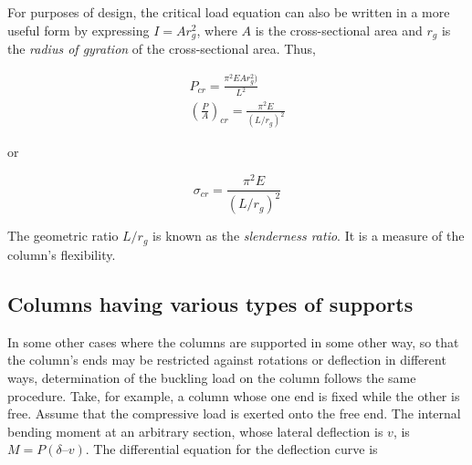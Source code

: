 \documentclass[
10pt,
a4paper,
openany,
svgnames,
]{book}
\begin{document}
For purposes of design, the critical load equation can also be written in a more useful form by expressing $I = Ar_g^2$, where $A$ is the cross-sectional area and $r_g$ is the \emph{radius of gyration} of the cross-sectional area. Thus,

\begin{gather*}
  P_{cr} = \frac{\pi^2EAr_g^2)}{L^2} \\ 
  \left( \frac{P}{A} \right)_{cr} = \frac{\pi ^2E}{(L/r_g)^2}
\end{gather*}

or

\begin{equation}
  \sigma_{cr} = \frac{\pi ^2E}{(L/r_g)^2}
\end{equation}

The geometric ratio $L/r_g$ is known as the \emph{slenderness ratio}. It is a measure of the column’s flexibility.

\subsection{Columns having various types of supports}

In some other cases where the columns are supported in some other way, so that the column’s ends may be restricted against rotations or deflection in different ways, determination of the buckling load on the column follows the same procedure. Take, for example, a column whose one end is fixed while the other is free. Assume that the compressive load is exerted onto the free end. The internal bending moment at an arbitrary section, whose lateral deflection is $v$, is $M = P(\delta – v)$. The differential equation for the deflection curve is

  \begin{figure}[H]
    \centering
  \end{figure}
\end{document}
